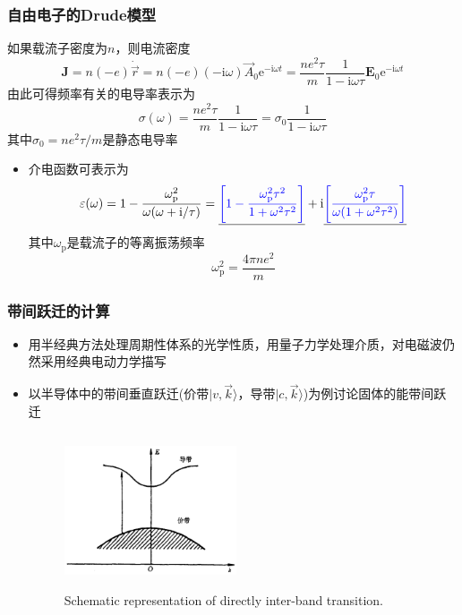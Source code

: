 \documentclass[cjk,slidestop,compress,mathserif,blue]{beamer}
\begin{document}
\frame
{
	\frametitle{自由电子的\textrm{Drude}模型}
	如果载流子密度为$n$，则电流密度
	\begin{displaymath}
		\mathbf{J}=n(-e)\dot{\vec r}=n(-e)(-\mathrm{i}\omega)\vec A_0\mathrm{e}^{-\mathrm{i}\omega t}=\frac{ne^2\tau}m\frac1{1-\mathrm{i}\omega\tau}\mathbf{E}_0\mathrm{e}^{-\mathrm{i}\omega t}
	\end{displaymath}
	由此可得频率有关的电导率表示为
	\begin{displaymath}
		\sigma(\omega)=\frac{ne^2\tau}m\frac1{1-\mathrm{i}\omega\tau}=\sigma_0\frac1{1-\mathrm{i}\omega\tau}
	\end{displaymath}
	其中$\sigma_0=ne^2\tau/m$是静态电导率
	\begin{itemize}
		\item 介电函数可表示为
			\begin{displaymath}
				\varepsilon(\omega)=1-\frac{\omega_\mathrm{p}^2}{\omega(\omega+\mathrm{i}/\tau)}=\underline{\textcolor{blue}{\left[ 1-\frac{\omega_{\mathrm{p}}^2\tau^2}{1+\omega^2\tau^2} \right]}}+\mathrm{i}\underline{\textcolor{blue}{\left[ \frac{\omega_{\mathrm{p}}^2\tau}{\omega(1+\omega^2\tau^2)} \right]}}
			\end{displaymath}
			其中$\omega_{\mathrm{p}}$是载流子的等离振荡频率
			\begin{displaymath}
				\omega_{\mathrm{p}}^2=\frac{4\pi ne^2}m
			\end{displaymath}
	\end{itemize}
}

\frame
{
\frametitle{带间跃迁的计算}
\begin{itemize}
\setlength{\itemsep}{10pt}
	\item 用半经典方法处理周期性体系的光学性质，用量子力学处理介质，对电磁波仍然采用经典电动力学描写
	\item 以半导体中的带间垂直跃迁(价带$|v,\vec k\rangle$，导带$|c,\vec k\rangle$)为例讨论固体的能带间跃迁
\begin{figure}[h!]
\centering
\vspace*{-0.3in}
\includegraphics[height=1.8in,width=2.0in,viewport=0 0 1000 900,clip]{Figures/optic_dir.png}
\caption{\fontsize{8.0pt}{5.2pt}\selectfont\textrm{Schematic representation of directly inter-band transition.}}%
\label{Optic-dir}
\end{figure} 
\end{itemize}
}
\end{document}
